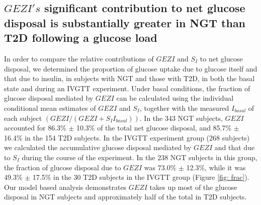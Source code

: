 \documentclass[utf8]{frontiersSCNS} %
\begin{document}
\subsection{$GEZI's$ significant contribution to net glucose disposal is substantially greater in NGT than T2D following a glucose load}
In order to compare the relative contributions of $GEZI$ and $S_I$ to net glucose disposal, we determined the proportion of glucose uptake due to glucose itself and that due to insulin, in subjects with NGT and those with T2D, in both the basal state and during an IVGTT experiment. Under basal conditions, the fraction of glucose disposal mediated by $GEZI$ can be calculated using the individual conditional mean estimates of $GEZI$ and $S_I$, together with the measured $I_{basal}$ of each subject $\left( {GEZI/\left( {GEZI + {S_I}{I_{basal}}} \right)} \right)$. In the 343 NGT subjects, $GEZI$ accounted for 86.3\% $\pm$ 10.3\% of the total net glucose disposal, and 85.7\% $\pm$ 16.4\% in the 154 T2D subjects. In the IVGTT experiment group (268 subjects) we calculated the accumulative glucose disposal mediated by $GEZI$ and that due to $S_I$ during the course of the experiment. In the 238 NGT subjects in this group, the fraction of glucose disposal due to $GEZI$ was 73.0\% $\pm$ 12.3\%, while it was 49.3\% $\pm$ 17.5\% in the 30 T2D subjects in the IVGTT group (Figure \ref{fig: frac}). Our model based analysis demonstrates $GEZI$ takes up most of the glucose disposal in NGT subjects and approximately half of the total in T2D subjects.  
\end{document}
